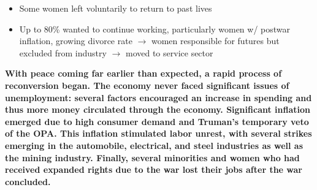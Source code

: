 \documentclass[a4paper]{article}
\begin{document}
{\begin{itemize}
\begin{itemize}
                \item Some women left voluntarily to return to past lives 
                \item Up to 80\% wanted to continue working, particularly women w/ postwar inflation, growing divorce rate $\to$ women responsible for futures but excluded from industry $\to$ moved to service sector
            \end{itemize}
        \end{itemize}
        \textbf{With peace coming far earlier than expected, a rapid process of reconversion began. The economy never faced significant issues of unemployment: several factors encouraged an increase in spending and thus more money circulated through the economy. Significant inflation emerged due to high consumer demand and Truman's temporary veto of the OPA. This inflation stimulated labor unrest, with several strikes emerging in the automobile, electrical, and steel industries as well as the mining industry. Finally, several minorities and women who had received expanded rights due to the war lost their jobs after the war concluded.}}
\end{document}
